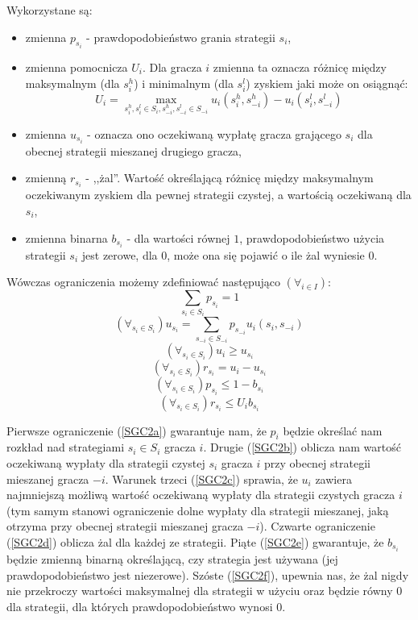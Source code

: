 \documentclass[polish]{standalone}
\begin{document}
Wykorzystane są: 
\begin{itemize}
\item zmienna $p_{s_i}$ - prawdopodobieństwo grania strategii $s_i$,
\item zmienna pomocnicza $U_i$. Dla gracza $i$ zmienna ta oznacza różnicę między maksymalnym (dla $s_i^h$) i minimalnym
(dla $s_i^l$) zyskiem jaki może on osiągnąć:
$$U_i = \max_{s_i^h, s_i^l \in S_i, s_{-i}^h, s_{-i}^l \in S_{-i}} u_i(s_i^h, s_{-i}^h) - u_i(s_i^l, s_{-i}^l)$$
\item zmienna $u_{s_i}$ - oznacza ono oczekiwaną wypłatę gracza grającego $s_i$ dla obecnej strategii mieszanej drugiego
gracza,
\item zmienną $r_{s_i}$ - ,,żal''. Wartość określającą różnicę między maksymalnym oczekiwanym zyskiem dla
pewnej strategii czystej, a wartością oczekiwaną dla $s_i$,
\item zmienna binarna $b_{s_i}$ - dla wartości równej $1$, prawdopodobieństwo użycia strategii $s_i$ jest zerowe,
dla $0$, może ona się pojawić o ile żal wyniesie $0$.
\end{itemize}

Wówczas ograniczenia możemy zdefiniować następująco $(\forall_{i \in I})$:
\begin{equation}
\sum_{{s_i} \in S_i} p_{s_i} = 1 \label{SGC2a}
\end{equation}
\begin{equation}
(\forall_{s_i \in S_i}) u_{s_i} = \sum_{s_{-i} \in S_{-i}} p_{s_{-i}} u_i(s_i, s_{-i}) \label{SGC2b}
\end{equation}
\begin{equation}
(\forall_{s_i \in S_i}) u_i \geq u_{s_i} \label{SGC2c}
\end{equation}
\begin{equation}
(\forall_{s_i \in S_i}) r_{s_i} = u_i - u_{s_i} \label{SGC2d}
\end{equation}
\begin{equation}
(\forall_{s_i \in S_i}) p_{s_i} \leq 1-b_{s_i} \label{SGC2e}
\end{equation}
\begin{equation}
(\forall_{s_i \in S_i}) r_{s_i} \leq U_i b_{s_i} \label{SGC2f}
\end{equation}

Pierwsze ograniczenie (\ref{SGC2a}) gwarantuje nam, że $p_i$ będzie określać nam rozkład nad strategiami $s_i \in S_i$
gracza $i$. Drugie (\ref{SGC2b}) oblicza nam wartość oczekiwaną wypłaty dla strategii czystej $s_i$ gracza $i$ przy
obecnej strategii mieszanej gracza $-i$. Warunek trzeci (\ref{SGC2c}) sprawia, że $u_i$ zawiera najmniejszą możliwą
wartość oczekiwaną wypłaty dla strategii czystych gracza $i$ (tym samym stanowi ograniczenie dolne wypłaty dla
strategii mieszanej, jaką otrzyma przy obecnej strategii mieszanej gracza $-i$). Czwarte ograniczenie (\ref{SGC2d})
oblicza żal dla każdej ze strategii. Piąte (\ref{SGC2e}) gwarantuje, że $b_{s_i}$ będzie zmienną binarną określającą,
czy strategia jest używana (jej prawdopodobieństwo jest niezerowe). Szóste (\ref{SGC2f}), upewnia nas, że żal nigdy nie
przekroczy wartości maksymalnej dla strategii w użyciu oraz będzie równy $0$ dla strategii, dla których
prawdopodobieństwo wynosi $0$.
\end{document}
